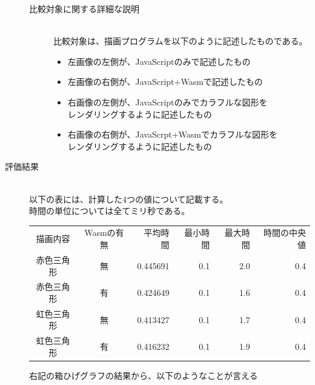 \begin{description}
\begin{figure}[h]
\begin{minipage}[b]{0.38\columnwidth}
			\label{fig:b}
		\end{minipage}
	\end{figure}
	\begin{description}
		\item[比較対象に関する詳細な説明]~\\	
		比較対象は、描画プログラムを以下のように記述したものである。
		\begin{itemize}
			\item 左画像の左側が、JavaScriptのみで記述したもの
			\item
			左画像の右側が、JavaScript+Wasmで記述したもの
			\item
			右画像の左側が、JavaScriptのみでカラフルな図形を\\レンダリングするように記述したもの
			\item
			右画像の右側が、JavaScrpt+Wasmでカラフルな図形を\\レンダリングするように記述したもの
		\end{itemize}	
	\end{description}
	\newpage
	
	\item[評価結果]~\\
	以下の表には、計算した4つの値について記載する。\\
	時間の単位については全てミリ秒である。
	
	\begin{table}
	\begin{tabular}{|c|c|r|r|r|r|} \hline
		描画内容&Wasmの有無&平均時間&最小時間&最大時間&時間の中央値\\
		赤色三角形&無&0.445691&0.1&2.0&0.4\\
		赤色三角形&有&0.424649&0.1&1.6&0.4\\
		虹色三角形&無&0.413427&0.1&1.7&0.4\\
		虹色三角形&有& 0.416232&0.1&1.9&0.4\\ \hline
	\end{tabular}
	\end{table}
	
	
	\newpage
	\begin{minipage}[t]{0.4\textwidth}\vspace{0pt}
		右記の箱ひげグラフの結果から、以下のようなことが言える
		

\end{minipage}
\end{description}
